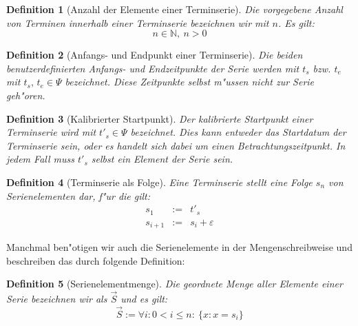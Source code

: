 \documentclass[a4paper]{article}
\numberwithin{equation}{section}
\newtheorem{dfn}{Definition}
\begin{document}
\begin{dfn}[Anzahl der Elemente einer Terminserie]\label{def:numOfElements}
  Die vorgegebene Anzahl von Terminen innerhalb einer Terminserie bezeichnen wir
  mit $n$. Es gilt:
  \begin{equation}n \in \mathbb{N},\ n > 0\end{equation}
\end{dfn}

\begin{dfn}[Anfangs- und Endpunkt einer Terminserie]
  Die beiden benutzerdefinierten Anfangs- und Endzeitpunkte der Serie werden mit
  $t_s$ bzw. $t_e$ mit $t_s,\,t_e \in \Psi$ bezeichnet. Diese Zeitpunkte selbst
  m"ussen nicht zur Serie geh"oren.
\end{dfn}

\begin{dfn}[Kalibrierter Startpunkt]
  Der kalibrierte Startpunkt einer Terminserie wird mit $t'_s \in \Psi$
  bezeichnet. Dies kann entweder das Startdatum der Terminserie sein, oder es
  handelt sich dabei um einen Betrachtungszeitpunkt. In jedem Fall muss $t'_s$
  selbst ein Element der Serie sein.
\end{dfn}

\begin{dfn}[Terminserie als Folge]\label{def:seriesAsSeries}
  Eine Terminserie stellt eine Folge $s_n$ von Serienelementen dar, f"ur die
  gilt:
  \begin{eqnarray}
    s_1 & := & t'_s \\
    s_{i+1} & := & s_i + \varepsilon
  \end{eqnarray}
\end{dfn}

\noindent Manchmal ben"otigen wir auch die Serienelemente in der
Mengenschreibweise und beschreiben das durch folgende Definition:
\begin{dfn}[Serienelementmenge]
  Die geordnete Menge aller Elemente einer Serie bezeichnen wir als $\vec{S}$
  und es gilt:
  \begin{equation}
    \vec{S} := \forall i : 0 < i \le n :\ \{ x : x = s_i \}
  \end{equation}
\end{dfn}


%
%
\end{document}
